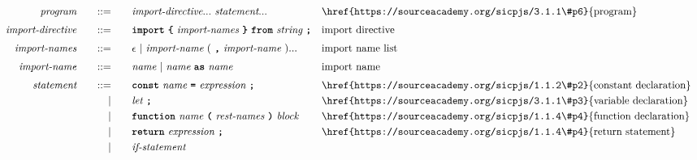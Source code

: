 \begin{alignat*}{9}
&& \textit{program}    &&\quad ::= &\quad && \textit{import-directive} ... \ \textit{statement} ...
                                                           && \textrm{\href{https://sourceacademy.org/sicpjs/3.1.1\#p6}{program}} \\[1mm]
&& \textit{import-directive}    &&\quad ::= &\quad && \textbf{\texttt{import}}\ \textbf{\texttt{\{}}\ \textit{import-names} \ \textbf{\texttt{\}}}\ \textbf{\texttt{from}}\  \textit{string} \ \textbf{\texttt{;}}
                                                           && \textrm{import directive} \\[1mm]
&& \textit{import-names}   && ::= &\quad &&  \epsilon\ | \  \textit{import-name} \ 
                                                   (\ \textbf{\texttt{,}} \ \textit{import-name}\ ) ...
                                                            && \textrm{import name list}   \\[1mm]
&& \textit{import-name}   && ::= &\quad &&  \textit{name}\ | \  \textit{name} \ \textbf{\texttt{as}}\ \textit{name} 
                                                            && \textrm{import name}   \\[1mm]
&& \textit{statement}    &&\quad ::= &\quad && \textbf{\texttt{const}}\  \textit{name} \ 
                                           \textbf{\texttt{=}}\  \textit{expression} \ \textbf{\texttt{;}}
                                                           && \textrm{\href{https://sourceacademy.org/sicpjs/1.1.2\#p2}{constant declaration}} \\
&&                       && |   &\quad && \textit{let} \ \textbf{\texttt{;}}
                                                           && \textrm{\href{https://sourceacademy.org/sicpjs/3.1.1\#p3}{variable declaration}} \\
&&                       && |   &\quad && \textbf{\texttt{function}}\  \textit{name} \ 
                                   \textbf{\texttt{(}}\  \textit{rest-names} \ \textbf{\texttt{)}}\ \textit{block} \quad
                                                           && \textrm{\href{https://sourceacademy.org/sicpjs/1.1.4\#p4}{function declaration}}\\
&&                       && |   &\quad && \textbf{\texttt{return}}\  \textit{expression} \ \textbf{\texttt{;}}
                                                           && \textrm{\href{https://sourceacademy.org/sicpjs/1.1.4\#p4}{return statement}}\\
&&                       && |   &\quad && \textit{if-statement} \quad

\end{alignat*}
